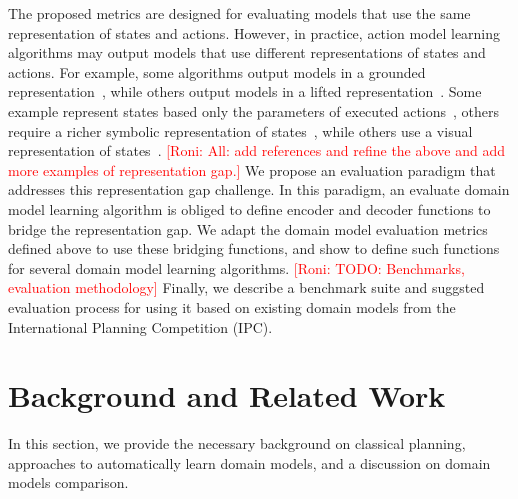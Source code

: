 \documentclass{article}
\theoremstyle{definition}
\theoremstyle{remark}
\newcommand{\roni}[1]{{\textcolor{red}{[Roni: #1]}}}
\begin{document}
The proposed metrics are designed for evaluating models that use the same representation of states and actions. 
However, in practice, action model learning algorithms may output models that use different representations of states and actions. For example, some algorithms output models in a grounded representation~\cite{stern2017efficient,others}, while others output models in a lifted representation~\cite{juba2021safe,xi2024neuro,aineto2019learning}. Some example represent states based only the parameters of executed actions~\cite{locm}, others require a richer symbolic representation of states~\cite{juba2021safe}, while others use a visual representation of states~\cite{xi2024neuro}.
\roni{All: add references and refine the above and add more examples of representation gap.}
We propose an evaluation paradigm that addresses this representation gap challenge. 
In this paradigm, an evaluate domain model learning algorithm is obliged to define encoder and decoder functions to bridge the representation gap. 
We adapt the domain model evaluation metrics defined above to use these bridging functions, 
and show to define such functions for several domain model learning algorithms. 
\roni{TODO: Benchmarks, evaluation methodology}
Finally, we describe a benchmark suite and suggsted evaluation process for using it based on existing domain models from the International Planning Competition (IPC).




\section{Background and Related Work}

In this section, we provide the necessary background on classical planning, approaches to automatically learn domain models, and a discussion on domain models comparison. 
\end{document}

